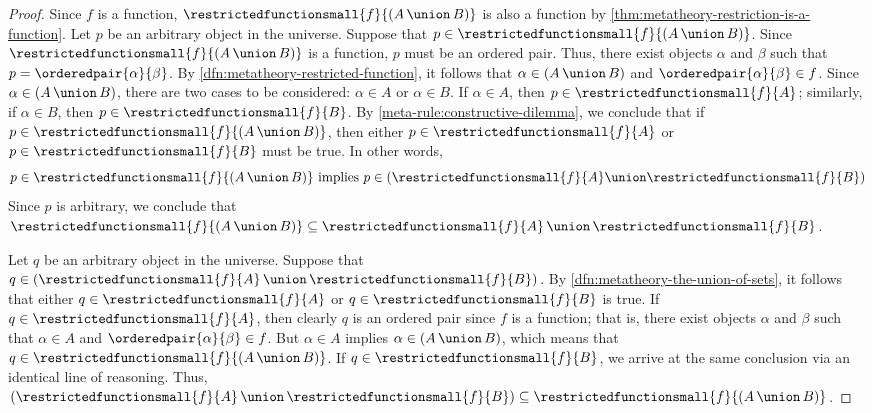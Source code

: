 \begin{proof}
    Since \( f \) is a function, \( \restrictedfunctionsmall{f}{\mleft( A \,{\union}\, B \mright)} \) is also a function
    by \cref{thm:metatheory-restriction-is-a-function}.
    Let \( p \) be an arbitrary object in the universe.
    Suppose that \( p \in \restrictedfunctionsmall{f}{\mleft( A \,{\union}\, B \mright)} \).
    Since \( \restrictedfunctionsmall{f}{\mleft( A \,{\union}\, B \mright)} \) is a function, \( p \) must be an ordered pair.
    Thus, there exist objects \( \alpha \) and \( \beta \) such that \( p = \orderedpair{\alpha}{\beta} \).
    By \cref{dfn:metatheory-restricted-function}, it follows that \( \alpha \in \mleft( A \,{\union}\, B \mright) \) and
    \( \orderedpair{\alpha}{\beta} \in f \).
    Since \( \alpha \in \mleft( A \,{\union}\, B \mright) \), there are two cases to be considered: \( \alpha \in A \) or \( \alpha \in B \).
    If \( \alpha \in A \), then \( p \in \restrictedfunctionsmall{f}{A} \); similarly, if \( \alpha \in B \), then \( p \in \restrictedfunctionsmall{f}{B} \).
    By \cref{meta-rule:constructive-dilemma}, we conclude that if \( p \in \restrictedfunctionsmall{f}{\mleft( A \,{\union}\, B \mright)} \),
    then either \( p \in \restrictedfunctionsmall{f}{A} \) or \( p \in \restrictedfunctionsmall{f}{B} \) must be true.
    In other words,
    \begin{equation*}
        p \in \restrictedfunctionsmall{f}{\mleft( A \,{\union}\, B \mright)}
        \ \text{implies}
        \ p \in \mleft( \restrictedfunctionsmall{f}{A} \union \restrictedfunctionsmall{f}{B} \mright)
    \end{equation*}
    Since \( p \) is arbitrary, we conclude that \( \restrictedfunctionsmall{f}{\mleft( A \,{\union}\, B \mright)} \subseteq \restrictedfunctionsmall{f}{A} \,{\union}\, \restrictedfunctionsmall{f}{B} \).

    \vspace{0.3cm}
    \noindent
    Let \( q \) be an arbitrary object in the universe.
    Suppose that \( q \in \mleft( \restrictedfunctionsmall{f}{A} \,{\union}\, \restrictedfunctionsmall{f}{B} \mright) \).
    By \cref{dfn:metatheory-the-union-of-sets}, it follows that either \( q \in \restrictedfunctionsmall{f}{A} \) or \( q \in \restrictedfunctionsmall{f}{B} \)
    is true.
    If \( q \in \restrictedfunctionsmall{f}{A} \), then clearly \( q \) is an ordered pair since \( f \) is a function; that is, there exist
    objects \( \alpha \) and \( \beta \) such that \( \alpha \in A \) and \( \orderedpair{\alpha}{\beta} \in f \).
    But \( \alpha \in A \) implies \( \alpha \in \mleft( A \,{\union}\, B \mright) \), which means that \( q \in \restrictedfunctionsmall{f}{\mleft( A \,{\union}\, B \mright)} \).
    If \( q \in \restrictedfunctionsmall{f}{B} \), we arrive at the same conclusion via an identical line of reasoning.
    Thus, \( \mleft( \restrictedfunctionsmall{f}{A} \,{\union}\, \restrictedfunctionsmall{f}{B} \mright) \subseteq \restrictedfunctionsmall{f}{\mleft( A \,{\union}\, B \mright)} \).
\end{proof}

